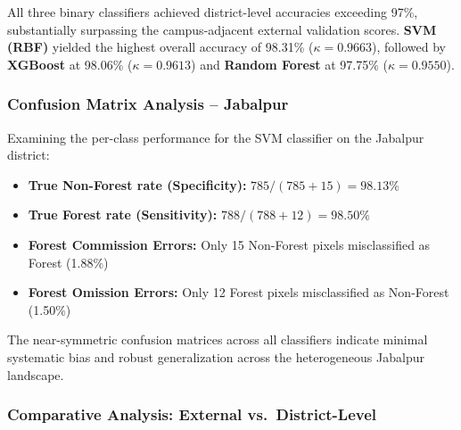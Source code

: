 \documentclass[12pt, a4paper, twocolumn]{article}
\begin{document}
All three binary classifiers achieved district-level accuracies exceeding 97\%, substantially surpassing the campus-adjacent external validation scores.
\textbf{SVM (RBF)} yielded the highest overall accuracy of 98.31\% ($\kappa = 0.9663$), followed by \textbf{XGBoost} at 98.06\% ($\kappa = 0.9613$) and \textbf{Random Forest} at 97.75\% ($\kappa = 0.9550$).

\subsubsection{Confusion Matrix Analysis -- Jabalpur}

Examining the per-class performance for the SVM classifier on the Jabalpur district:

\begin{itemize}
    \item \textbf{True Non-Forest rate (Specificity):} $785 / (785 + 15) = 98.13\%$
    \item \textbf{True Forest rate (Sensitivity):} $788 / (788 + 12) = 98.50\%$
    \item \textbf{Forest Commission Errors:} Only 15 Non-Forest pixels misclassified as Forest (1.88\%)
    \item \textbf{Forest Omission Errors:} Only 12 Forest pixels misclassified as Non-Forest (1.50\%)
\end{itemize}

The near-symmetric confusion matrices across all classifiers indicate minimal systematic bias and robust generalization across the heterogeneous Jabalpur landscape.

\subsubsection{Comparative Analysis: External vs.\ District-Level}

\begin{table}[H]
\centering
\caption{Accuracy comparison across validation scales.}
\label{tab:scale_comparison}
\end{table}
\end{document}
